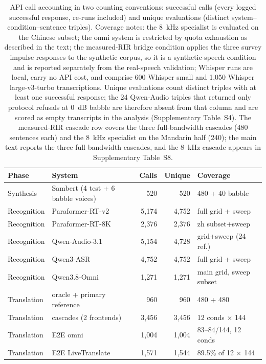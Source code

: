 \begin{table}[t]
\centering
\caption{API call accounting in two counting conventions: successful calls
(every logged successful response, re-runs included) and unique evaluations
(distinct system--condition--sentence triples). Coverage notes: the 8~kHz
specialist is evaluated on the Chinese subset; the omni system is restricted
by quota exhaustion as described in the text; the measured-RIR bridge
condition applies the three survey impulse responses to the synthetic
corpus, so it is a synthetic-speech condition and is reported separately
from the real-speech validation; Whisper runs are local, carry no API
cost, and comprise 600 Whisper small and 1{,}050 Whisper large-v3-turbo
transcriptions. Unique evaluations count distinct triples with at least one
successful response; the 24 Qwen-Audio triples that returned only protocol
refusals at 0~dB babble are therefore absent from that column and are scored
as empty transcripts in the analysis (Supplementary Table~S4). The
measured-RIR cascade row covers the three full-bandwidth cascades (480
sentences each) and the 8~kHz specialist on the Mandarin half (240); the
main text reports the three full-bandwidth cascades, and the 8~kHz cascade
appears in Supplementary Table~S8.}\label{tab:accounting}
\footnotesize
\setlength{\tabcolsep}{1.7pt}
\begin{tabular}{llrrl}
\toprule
Phase & System & Calls & Unique & Coverage \\
\midrule
Synthesis & Sambert (4 test + 6 babble voices) & 520 & 520 & 480 + 40 babble \\
Recognition & Paraformer-RT-v2 & 5{,}174 & 4{,}752 & full grid + sweep \\
Recognition & Paraformer-RT-8K & 2{,}376 & 2{,}376 & zh subset+sweep \\
Recognition & Qwen-Audio-3.1 & 5{,}154 & 4{,}728 & grid+sweep (24 ref.) \\
Recognition & Qwen3-ASR & 4{,}752 & 4{,}752 & full grid + sweep \\
Recognition & Qwen3.8-Omni & 1{,}271 & 1{,}271 & main grid, sweep subset \\
Translation & oracle + primary reference & 960 & 960 & 480 + 480 \\
Translation & cascades (2 frontends) & 3{,}456 & 3{,}456 & 12 conds $\times$ 144 \\
Translation & E2E omni & 1{,}004 & 1{,}004 & 83--84/144, 12 conds \\
Translation & E2E LiveTranslate & 1{,}571 & 1{,}544 & 89.5\% of 12 $\times$ 144 \\

\end{tabular}
\end{table}

